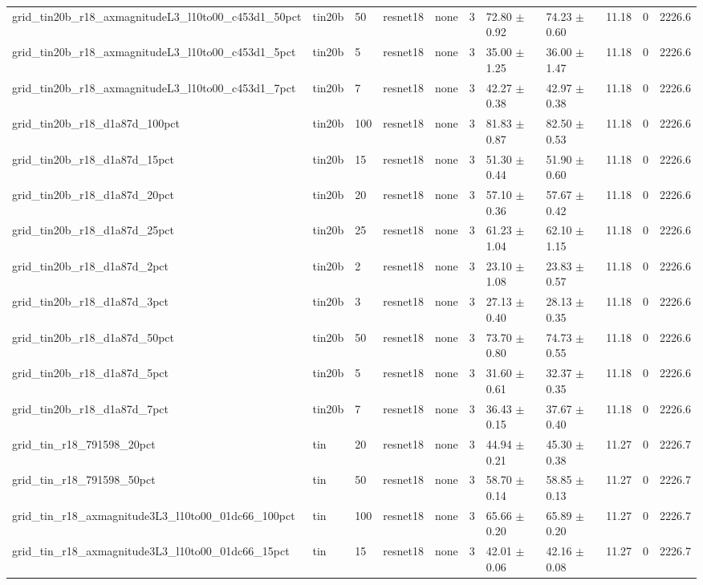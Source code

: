 \begin{tabular}{lllllllllll}
grid_tin20b_r18_axmagnitudeL3_l10to00_c453d1_50pct & tin20b & 50 & resnet18 & none & 3 & 72.80 $\pm$ 0.92 & 74.23 $\pm$ 0.60 & 11.18 & 0 & 2226.6 \\
grid_tin20b_r18_axmagnitudeL3_l10to00_c453d1_5pct & tin20b & 5 & resnet18 & none & 3 & 35.00 $\pm$ 1.25 & 36.00 $\pm$ 1.47 & 11.18 & 0 & 2226.6 \\
grid_tin20b_r18_axmagnitudeL3_l10to00_c453d1_7pct & tin20b & 7 & resnet18 & none & 3 & 42.27 $\pm$ 0.38 & 42.97 $\pm$ 0.38 & 11.18 & 0 & 2226.6 \\
grid_tin20b_r18_d1a87d_100pct & tin20b & 100 & resnet18 & none & 3 & 81.83 $\pm$ 0.87 & 82.50 $\pm$ 0.53 & 11.18 & 0 & 2226.6 \\
grid_tin20b_r18_d1a87d_15pct & tin20b & 15 & resnet18 & none & 3 & 51.30 $\pm$ 0.44 & 51.90 $\pm$ 0.60 & 11.18 & 0 & 2226.6 \\
grid_tin20b_r18_d1a87d_20pct & tin20b & 20 & resnet18 & none & 3 & 57.10 $\pm$ 0.36 & 57.67 $\pm$ 0.42 & 11.18 & 0 & 2226.6 \\
grid_tin20b_r18_d1a87d_25pct & tin20b & 25 & resnet18 & none & 3 & 61.23 $\pm$ 1.04 & 62.10 $\pm$ 1.15 & 11.18 & 0 & 2226.6 \\
grid_tin20b_r18_d1a87d_2pct & tin20b & 2 & resnet18 & none & 3 & 23.10 $\pm$ 1.08 & 23.83 $\pm$ 0.57 & 11.18 & 0 & 2226.6 \\
grid_tin20b_r18_d1a87d_3pct & tin20b & 3 & resnet18 & none & 3 & 27.13 $\pm$ 0.40 & 28.13 $\pm$ 0.35 & 11.18 & 0 & 2226.6 \\
grid_tin20b_r18_d1a87d_50pct & tin20b & 50 & resnet18 & none & 3 & 73.70 $\pm$ 0.80 & 74.73 $\pm$ 0.55 & 11.18 & 0 & 2226.6 \\
grid_tin20b_r18_d1a87d_5pct & tin20b & 5 & resnet18 & none & 3 & 31.60 $\pm$ 0.61 & 32.37 $\pm$ 0.35 & 11.18 & 0 & 2226.6 \\
grid_tin20b_r18_d1a87d_7pct & tin20b & 7 & resnet18 & none & 3 & 36.43 $\pm$ 0.15 & 37.67 $\pm$ 0.40 & 11.18 & 0 & 2226.6 \\
grid_tin_r18_791598_20pct & tin & 20 & resnet18 & none & 3 & 44.94 $\pm$ 0.21 & 45.30 $\pm$ 0.38 & 11.27 & 0 & 2226.7 \\
grid_tin_r18_791598_50pct & tin & 50 & resnet18 & none & 3 & 58.70 $\pm$ 0.14 & 58.85 $\pm$ 0.13 & 11.27 & 0 & 2226.7 \\
grid_tin_r18_axmagnitude3L3_l10to00_01dc66_100pct & tin & 100 & resnet18 & none & 3 & 65.66 $\pm$ 0.20 & 65.89 $\pm$ 0.20 & 11.27 & 0 & 2226.7 \\
grid_tin_r18_axmagnitude3L3_l10to00_01dc66_15pct & tin & 15 & resnet18 & none & 3 & 42.01 $\pm$ 0.06 & 42.16 $\pm$ 0.08 & 11.27 & 0 & 2226.7 \\

\end{tabular}
